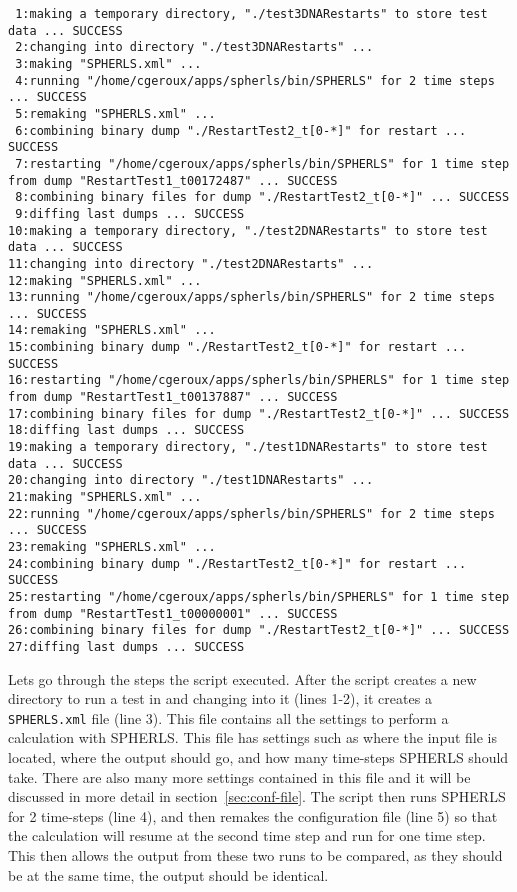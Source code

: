 \documentclass[12pt,a4paper]{book}
\begin{document}
{\tiny
\begin{verbatim}
 1:making a temporary directory, "./test3DNARestarts" to store test data ... SUCCESS
 2:changing into directory "./test3DNARestarts" ...
 3:making "SPHERLS.xml" ...
 4:running "/home/cgeroux/apps/spherls/bin/SPHERLS" for 2 time steps ... SUCCESS
 5:remaking "SPHERLS.xml" ...
 6:combining binary dump "./RestartTest2_t[0-*]" for restart ... SUCCESS
 7:restarting "/home/cgeroux/apps/spherls/bin/SPHERLS" for 1 time step from dump "RestartTest1_t00172487" ... SUCCESS
 8:combining binary files for dump "./RestartTest2_t[0-*]" ... SUCCESS
 9:diffing last dumps ... SUCCESS
10:making a temporary directory, "./test2DNARestarts" to store test data ... SUCCESS
11:changing into directory "./test2DNARestarts" ...
12:making "SPHERLS.xml" ...
13:running "/home/cgeroux/apps/spherls/bin/SPHERLS" for 2 time steps ... SUCCESS
14:remaking "SPHERLS.xml" ...
15:combining binary dump "./RestartTest2_t[0-*]" for restart ... SUCCESS
16:restarting "/home/cgeroux/apps/spherls/bin/SPHERLS" for 1 time step from dump "RestartTest1_t00137887" ... SUCCESS
17:combining binary files for dump "./RestartTest2_t[0-*]" ... SUCCESS
18:diffing last dumps ... SUCCESS
19:making a temporary directory, "./test1DNARestarts" to store test data ... SUCCESS
20:changing into directory "./test1DNARestarts" ...
21:making "SPHERLS.xml" ...
22:running "/home/cgeroux/apps/spherls/bin/SPHERLS" for 2 time steps ... SUCCESS
23:remaking "SPHERLS.xml" ...
24:combining binary dump "./RestartTest2_t[0-*]" for restart ... SUCCESS
25:restarting "/home/cgeroux/apps/spherls/bin/SPHERLS" for 1 time step from dump "RestartTest1_t00000001" ... SUCCESS
26:combining binary files for dump "./RestartTest2_t[0-*]" ... SUCCESS
27:diffing last dumps ... SUCCESS
\end{verbatim}
}

Lets go through the steps the script executed. After the script creates a new directory to run a test in and changing into it (lines 1-2), it creates a {\tt SPHERLS.xml} file (line 3). This file contains all the settings to perform a calculation with SPHERLS. This file has settings such as where the input file is located, where the output should go, and how many time-steps SPHERLS should take. There are also many more settings contained in this file and it will be discussed in more detail in section~\ref{sec:conf-file}. The script then runs SPHERLS for 2 time-steps (line 4), and then remakes the configuration file (line 5) so that the calculation will resume at the second time step and run for one time step. This then allows the output from these two runs to be compared, as they should be at the same time, the output should be identical. 
\end{document}
